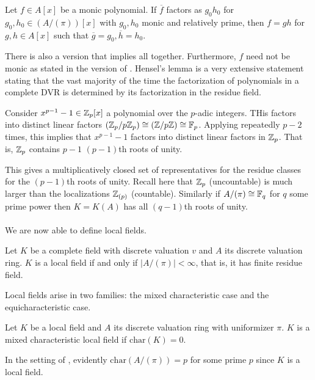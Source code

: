 \begin{lemma}\label{lem: Hensel III}
  Let $f\in A[x]$ be a monic polynomial. If $\overline{f}$ factors as $g_{0}h_{0}$ for $g_{0},h_{0}\in (A/(\pi))[x]$ with $g_{0},h_{0}$ monic and relatively prime, then $f=gh$ for $g,h\in A[x]$ such that $\overline{g}=g_{0}, \overline{h}=h_{0}$. 
\end{lemma}
There is also a version that implies  all together. Furthermore, $f$ need not be monic as stated in the version of \cite[Ch. 2, Thm. 4.6]{Neukirch}. Hensel's lemma is a very extensive statement stating that the vast majority of the time the factorization of polynomials in a complete DVR is determined by its factorization in the residue field. 
\begin{example}
  Consider $x^{p-1}-1\in \mathbb{Z}_{p}[x]$ a polynomial over the $p$-adic integers. THis factors into distinct linear factors $(\mathbb{Z}_{p}/p\mathbb{Z}_{p})\cong(\mathbb{Z}/p\mathbb{Z})\cong\mathbb{F}_{p}$. Applying  repeatedly $p-2$ times, this implies that $x^{p-1}-1$ factors into distinct linear factors in $\mathbb{Z}_{p}$. That is, $\mathbb{Z}_{p}$ contains $p-1$ $(p-1)$th roots of unity. 
\end{example}
This gives a multiplicatively closed set of representatives for the residue classes for the $(p-1)$th roots of unity. Recall here that $\mathbb{Z}_{p}$ (uncountable) is much larger than the localizations $\mathbb{Z}_{(p)}$ (countable). Similarly if $A/(\pi)\cong\mathbb{F}_{q}$ for $q$ some prime power then $K=K(A)$ has all $(q-1)$th roots of unity. 
\\\\
We are now able to define local fields. 
\begin{definition}\label{def: local field}
  Let $K$ be a complete field with discrete valuation $v$ and $A$ its discrete valuation ring. $K$ is a local field if and only if $|A/(\pi)|<\infty$, that is, it has finite residue field. 
\end{definition}
Local fields arise in two families: the mixed characteristic case and the equicharacteristic case. 
\begin{definition}\label{def: mixed characteristic local field}
  Let $K$ be a local field and $A$ its discrete valuation ring with uniformizer $\pi$. $K$ is a mixed characteristic local field if $\mathrm{char}(K)=0$. 
\end{definition}
\begin{remark}
  In the setting of , evidently $\mathrm{char}(A/(\pi))=p$ for some prime $p$ since $K$ is a local field. 
\end{remark}
